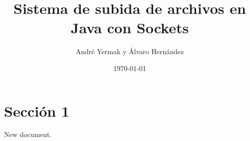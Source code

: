 \documentclass{article}
\title{Sistema de subida de archivos en Java con Sockets}
\author{André Yermak y Álvaro Hernández}
\date{\today}
\begin{document}

\maketitle
\tableofcontents
\newpage

\section{Sección 1}
New document.
\end{document}
